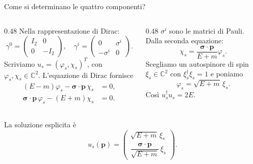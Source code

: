 \begin{frame}{Come si determinano le quattro componenti?}
\small
\begin{columns}[T,onlytextwidth]
\begin{column}{0.48\textwidth}
Nella rappresentazione di Dirac:
\[
 \gamma^0=\begin{pmatrix}I_2&0\\0&-I_2\end{pmatrix},
 \quad
 \gamma^i=\begin{pmatrix}0&\sigma^i\\-\sigma^i&0\end{pmatrix}.
\]
Scriviamo $u_s=(\varphi_s,\chi_s)^T$, con
$\varphi_s,\chi_s\in\mathbb C^2$.
L'equazione di Dirac fornisce
\[
 \begin{aligned}
 (E-m)\varphi_s-\boldsymbol\sigma\!\cdot\!\mathbf p\,\chi_s&=0,\\
 \boldsymbol\sigma\!\cdot\!\mathbf p\,\varphi_s-(E+m)\chi_s&=0.
 \end{aligned}
\]
\end{column}
\begin{column}{0.48\textwidth}
$\sigma^i$ sono le matrici di Pauli. Dalla seconda equazione:
\[
 \chi_s=\frac{\boldsymbol\sigma\cdot\mathbf p}{E+m}\varphi_s.
\]
Scegliamo un autospinore di spin
$\xi_s\in\mathbb C^2$ con
$\xi_s^\dagger\xi_s=1$ e poniamo
\[
 \varphi_s=\sqrt{E+m}\,\xi_s.
\]
Così $u_s^\dagger u_s=2E$.
\end{column}
\end{columns}
\medskip
La soluzione esplicita è
\[
 u_s(\mathbf p)=
 \begin{pmatrix}
  \sqrt{E+m}\,\xi_s\\[2pt]
  \dfrac{\boldsymbol\sigma\cdot\mathbf p}{\sqrt{E+m}}\,\xi_s
 \end{pmatrix}.
\]
\end{frame}

